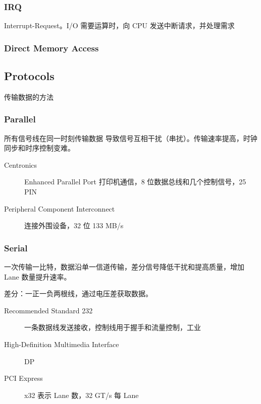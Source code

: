 \documentclass[11pt,journal,compsoc]{IEEEtran}
\begin{document}
\subsubsection{IRQ}

Interrupt-Request。I/O 需要运算时，向 CPU 发送中断请求，并处理需求


\subsubsection{Direct Memory Access}


\subsection{Protocols}

传输数据的方法


\subsubsection{Parallel}

所有信号线在同一时刻传输数据 导致信号互相干扰（串扰）。传输速率提高，时钟同步和时序控制变难。

\begin{description}
    \item[Centronics] Enhanced Parallel Port 打印机通信，8 位数据总线和几个控制信号，25 PIN

    \item[Peripheral Component Interconnect] 连接外围设备，32 位 133 MB/s
\end{description}


\subsubsection{Serial}

一次传输一比特，数据沿单一信道传输，差分信号降低干扰和提高质量，增加 Lane 数量提升速率。

差分：一正一负两根线，通过电压差获取数据。

\begin{description}
    \item[Recommended Standard 232] 一条数据线发送接收，控制线用于握手和流量控制，工业

    \item[High-Definition Multimedia Interface] DP

    \item[PCI Express] x32 表示 Lane 数，32 GT/s 每 Lane
\end{description}
\end{document}

